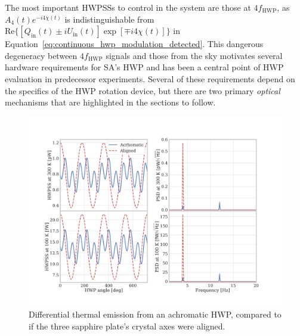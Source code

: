 The most important HWPSSs to control in the system are those at $4 f_{\mathrm{HWP}}$, as $A_{4}(t) e^{- i 4 \chi(t)}$ is indistinguishable from $\mathrm{Re} \{ \left[ Q_{\mathrm{in}}(t) \pm i U_{\mathrm{in}}(t) \right] \exp \left[ \mp i 4 \chi(t) \right] \}$ in Equation~\ref{eq:continuous_hwp_modulation_detected}. This dangerous degeneracy between $4 f_{\mathrm{HWP}}$ signals and those from the sky motivates several hardware requirements for SA's HWP and has been a central point of HWP evaluation in predecessor experiments. Several of these requirements depend on the specifics of the HWP rotation device, but there are two primary \textit{optical} mechanisms that are highlighted in the sections to follow.

\begin{figure}[!t]
    \centering
    \includegraphics[width=\linewidth, trim=3cm 3cm 4cm 4cm, clip]{PolarizationModulation/Figures/ahwp_thermal_emission_hwpss.pdf}
    \caption{Differential thermal emission from an achromatic HWP, compared to if the three sapphire plate's crystal axes were aligned.}
    \label{fig:ahwp_differential_thermal_emission}
\end{figure}

